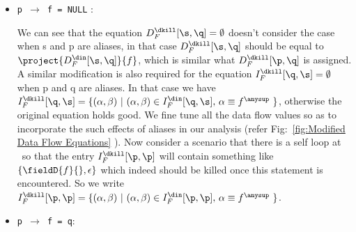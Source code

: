 \begin{itemize}
\item{\tt p $\rightarrow$ f = NULL}	: 

We can see that the equation $D_F^{\dkill}[\s,\q] = \emptyset$ doesn't consider the case when s and p are aliases,
in that case $D_F^{\dkill}[\s,\q]$ should be equal to $\project{D_F^{\din}[\s,\q]}{f}$, which is similar what $D_F^{\dkill}[\p,\q]$ is assigned.
A similar modification is also required for the equation $I_F^{\dkill}[\q,\s] = \emptyset$ when p and q are aliases. In that case we have
 $I_F^{\dkill}[\q,\s] = \{(\alpha, \beta) \ \vert\ (\alpha,   \beta) \in I_F^{\din}[\q, \s] \mbox,\ \alpha \equiv  f^\anysup \ \}$, otherwise
 the original equation holds good. We fine tune all the data flow values so as to incorporate the such effects of aliases in our analysis (refer Fig:~\ref{fig:Modified Data Flow Equations} ).
Now consider a scenario that there is a self loop at \p\ so that the entry $I_F^{\dkill}[\p,\p]$ will contain something like $\{ \fieldD{f}{} ,\epsilon \}$ 
which indeed should be killed once this statement is encountered. So we write 
$I_F^{\dkill}[\p,\p] = \{(\alpha, \beta) \ \vert\ (\alpha,   \beta) \in I_F^{\din}[\p, \p] \mbox,\ \alpha \equiv  f^\anysup \ \}$. 


           
\item{\tt p $\rightarrow$ f = q}:


\begin{figure}[h]
\begin{center}
\begin{tabular}{c}


\end{tabular}
\end{center}
\end{figure}
\end{itemize}
